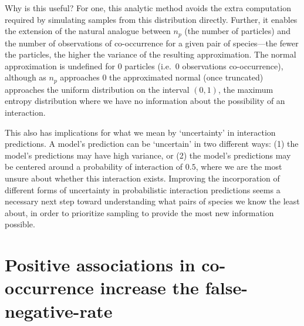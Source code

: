 \documentclass[11pt]{article}
\begin{document}
Why is this useful? For one, this analytic method avoids the extra
computation required by simulating samples from this distribution
directly. Further, it enables the extension of the natural analogue
between \(n_p\) (the number of particles) and the number of observations
of co-occurrence for a given pair of species---the fewer the particles,
the higher the variance of the resulting approximation. The normal
approximation is undefined for 0 particles (i.e.~0 observations
co-occurrence), although as \(n_p\) approaches 0 the approximated normal
(once truncated) approaches the uniform distribution on the interval
\((0,1)\), the maximum entropy distribution where we have no information
about the possibility of an interaction.

This also has implications for what we mean by `uncertainty' in
interaction predictions. A model's prediction can be `uncertain' in two
different ways: (1) the model's predictions may have high variance, or
(2) the model's predictions may be centered around a probability of
interaction of \(0.5\), where we are the most unsure about whether this
interaction exists. Improving the incorporation of different forms of
uncertainty in probabilistic interaction predictions seems a necessary
next step toward understanding what pairs of species we know the least
about, in order to prioritize sampling to provide the most new
information possible.

\hypertarget{positive-associations-in-co-occurrence-increase-the-false-negative-rate}{%
\section{Positive associations in co-occurrence increase the
false-negative-rate}\label{positive-associations-in-co-occurrence-increase-the-false-negative-rate}}
\end{document}

